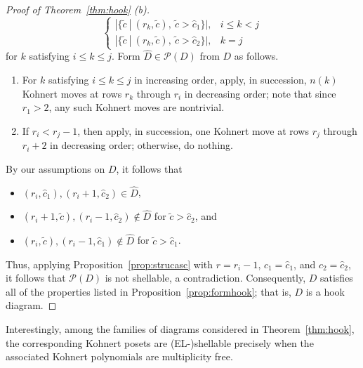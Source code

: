 \documentclass[letterpaper,10pt]{article}
\begin{document}
\begin{proof}[Proof of Theorem~\ref{thm:hook} \textup(b\textup)]
$$\begin{cases}
        |\{\tilde{c}~|~(r_k,\tilde{c}),~\tilde{c}>\widehat{c}_1\}|, & i\le k<j \\
        |\{\tilde{c}~|~(r_k,\tilde{c}),~\tilde{c}>\widehat{c}_2\}|,& k=j
    \end{cases}$$
    for $k$ satisfying $i\le k\le j$. Form $\widehat{D}\in \mathcal{P}(D)$ from $D$ as follows.
    \begin{enumerate}
        \item[1)] For $k$ satisfying $i\le k \le j$ in increasing order, apply, in succession, $n(k)$ Kohnert moves at rows $r_k$ through $r_i$ in decreasing order; note that since $r_1>2$, any such Kohnert moves are nontrivial.
        \item[2)] If $r_i<r_j-1$, then apply, in succession, one Kohnert move at rows $r_j$ through $r_i+2$ in decreasing order; otherwise, do nothing.
    \end{enumerate}
    By our assumptions on $D$, it follows that
    \begin{itemize}
        \item $(r_i,\widehat{c}_1),(r_i+1,\widehat{c}_2)\in \widehat{D}$,
        \item $(r_i+1,\tilde{c}),(r_i-1,\widehat{c}_2)\notin \widehat{D}$ for $\tilde{c}>\widehat{c}_2$, and
        \item $(r_i,\tilde{c}),(r_i-1,\widehat{c}_1)\notin \widehat{D}$ for $\tilde{c}>\widehat{c}_1$.
    \end{itemize}
    Thus, applying Proposition~\ref{prop:strucasc} with $r=r_i-1$, $c_1=\widehat{c}_1$, and $c_2=\widehat{c}_2$, it follows that $\mathcal{P}(D)$ is not shellable, a contradiction. Consequently, $D$ satisfies all of the properties listed in Proposition~\ref{prop:formhook}; that is, $D$ is a hook diagram.
\end{proof}

Interestingly, among the families of diagrams considered in Theorem~\ref{thm:hook}, the corresponding Kohnert posets are (EL-)shellable precisely when the associated Kohnert polynomials are multiplicity free.
\end{document}

